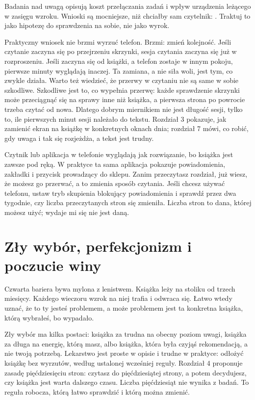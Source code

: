 Badania nad uwagą opisują koszt przełączania zadań i wpływ urządzenia leżącego w zasięgu wzroku. Wnioski są mocniejsze, niż chciałby sam czytelnik: . Traktuj to jako hipotezę do sprawdzenia na sobie, nie jako wyrok.

Praktyczny wniosek nie brzmi \glqq wyrzuć telefon\grqq{}. Brzmi: zmień kolejność. Jeśli czytanie zaczyna się po przejrzeniu skrzynki, sesja czytania zaczyna się już w rozproszeniu. Jeśli zaczyna się od książki, a telefon zostaje w innym pokoju, pierwsze minuty wyglądają inaczej. Ta zamiana, a nie siła woli, jest tym, co zwykle działa. Warto też wiedzieć, że przerwy w czytaniu nie są same w sobie szkodliwe. Szkodliwe jest to, co wypełnia przerwę: każde sprawdzenie skrzynki może przeciągnąć się na sprawy inne niż książka, a pierwsza strona po powrocie trzeba czytać od nowa. Dlatego dobrym miernikiem nie jest długość sesji, tylko to, ile pierwszych minut sesji należało do tekstu. Rozdział 3 pokazuje, jak zamienić ekran na książkę w konkretnych oknach dnia; rozdział 7 mówi, co robić, gdy uwaga i tak się rozjeżdża, a tekst jest trudny.

\begin{falle}
Czytnik lub aplikacja w telefonie wyglądają jak rozwiązanie, bo książka jest zawsze pod ręką. W praktyce ta sama aplikacja pokazuje powiadomienia, zakładki i przycisk prowadzący do sklepu. Zanim przeczytasz rozdział, już wiesz, że możesz go przerwać, a to zmienia sposób czytania. Jeśli chcesz używać telefonu, ustaw tryb skupienia blokujący powiadomienia i sprawdź przez dwa tygodnie, czy liczba przeczytanych stron się zmieniła. Liczba stron to dana, której możesz użyć; \glqq wydaje mi się\grqq{} nie jest daną.
\end{falle}

\section{Zły wybór, perfekcjonizm i poczucie winy}

Czwarta bariera bywa mylona z lenistwem. Książka leży na stoliku od trzech miesięcy. Każdego wieczoru wzrok na niej trafia i odwraca się. Łatwo wtedy uznać, że to ty jesteś problemem, a może problemem jest ta konkretna książka, którą wybrałeś, bo wypadało.

Zły wybór ma kilka postaci: książka za trudna na obecny poziom uwagi, książka za długa na energię, którą masz, albo książka, która była czyjąś rekomendacją, a nie twoją potrzebą. Lekarstwo jest proste w opisie i trudne w praktyce: odłożyć książkę bez wyrzutów, według ustalonej wcześniej reguły. Rozdział 4 proponuje zasadę pięćdziesięciu stron: czytasz do pięćdziesiątej strony, a potem decydujesz, czy książka jest warta dalszego czasu. Liczba pięćdziesiąt nie wynika z badań. To reguła robocza, którą łatwo sprawdzić i którą można zmienić.

